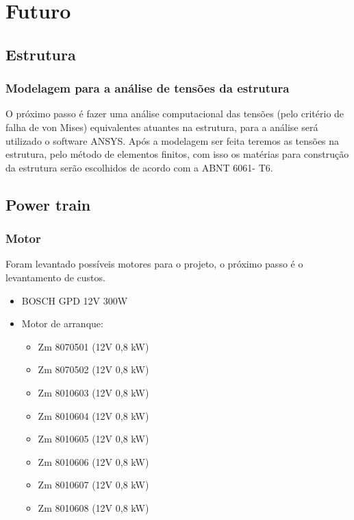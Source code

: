 \chapter[Futuro]{Futuro}

\section{Estrutura}

\subsection{Modelagem para a análise de tensões da estrutura}

O próximo passo é fazer uma análise computacional das tensões (pelo critério de falha de von Mises) equivalentes atuantes na estrutura, para a análise  será utilizado o software ANSYS. Após a modelagem ser feita teremos as tensões na estrutura, pelo método de elementos finitos, com isso os matérias para construção da estrutura serão escolhidos de acordo com a  ABNT 6061- T6.

\section{Power train}

\subsection{Motor}

Foram levantado possíveis motores para o projeto, o próximo passo é o levantamento de custos.

\begin{itemize}
 \item BOSCH GPD 12V 300W
 \item Motor de arranque:
  \begin{itemize}
    \item Zm 8070501 (12V 0,8 kW)
    \item Zm 8070502 (12V 0,8 kW)
    \item Zm 8010603 (12V 0,8 kW)
    \item Zm 8010604 (12V 0,8 kW)
    \item Zm 8010605 (12V 0,8 kW)
    \item Zm 8010606 (12V 0,8 kW)
    \item Zm 8010607 (12V 0,8 kW)
    \item Zm 8010608 (12V 0,8 kW)
  \end{itemize}
\end{itemize}

